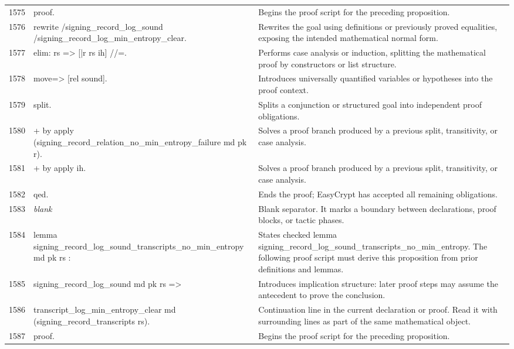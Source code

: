 \documentclass[10pt]{article}
\begin{document}
\begin{longtable}{r L{0.53\textwidth} L{0.37\textwidth}}
1575 & {\ttfamily\scriptsize proof.} & Begins the proof script for the preceding proposition. \\
1576 & {\ttfamily\scriptsize rewrite /signing\_record\_log\_sound /signing\_record\_log\_min\_entropy\_clear.} & Rewrites the goal using definitions or previously proved equalities, exposing the intended mathematical normal form. \\
1577 & {\ttfamily\scriptsize elim: rs => [|r rs ih] //=.} & Performs case analysis or induction, splitting the mathematical proof by constructors or list structure. \\
1578 & {\ttfamily\scriptsize move=> [rel sound].} & Introduces universally quantified variables or hypotheses into the proof context. \\
1579 & {\ttfamily\scriptsize split.} & Splits a conjunction or structured goal into independent proof obligations. \\
1580 & {\ttfamily\scriptsize + by apply (signing\_record\_relation\_no\_min\_entropy\_failure md pk r).} & Solves a proof branch produced by a previous split, transitivity, or case analysis. \\
1581 & {\ttfamily\scriptsize + by apply ih.} & Solves a proof branch produced by a previous split, transitivity, or case analysis. \\
1582 & {\ttfamily\scriptsize qed.} & Ends the proof; EasyCrypt has accepted all remaining obligations. \\
1583 & {\ttfamily\scriptsize \emph{blank}} & Blank separator.  It marks a boundary between declarations, proof blocks, or tactic phases. \\
1584 & {\ttfamily\scriptsize lemma signing\_record\_log\_sound\_transcripts\_no\_min\_entropy md pk rs :} & States checked lemma signing\_record\_log\_sound\_transcripts\_no\_min\_entropy.  The following proof script must derive this proposition from prior definitions and lemmas. \\
1585 & {\ttfamily\scriptsize   signing\_record\_log\_sound md pk rs =>} & Introduces implication structure: later proof steps may assume the antecedent to prove the conclusion. \\
1586 & {\ttfamily\scriptsize   transcript\_log\_min\_entropy\_clear md (signing\_record\_transcripts rs).} & Continuation line in the current declaration or proof.  Read it with surrounding lines as part of the same mathematical object. \\
1587 & {\ttfamily\scriptsize proof.} & Begins the proof script for the preceding proposition. \\

\end{longtable}
\end{document}
